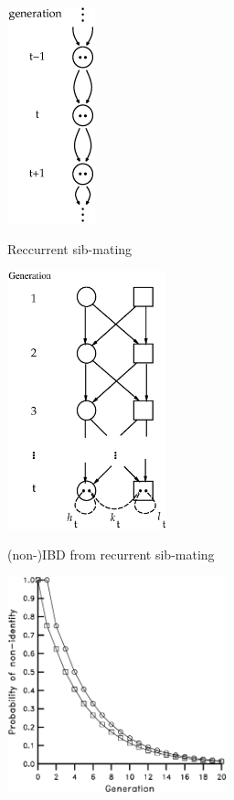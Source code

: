 \documentclass[bluish,slideColor,colorBG,pdf]{prosper}
\begin{document}
\begin{slide}[Replace]{}

\centerline{\includegraphics[width=1.0in]{fig5-6.ps}}

\end{slide}

\begin{slide}[Replace]{Reccurrent sib-mating}

\centerline{\includegraphics[width=1.8in]{fig5-7.ps}}

\end{slide}

\begin{slide}[Replace]{(non-)IBD from recurrent sib-mating}

\centerline{\includegraphics[width=2.5in]{fig5-8a.ps}}

\end{slide}
\end{document}
